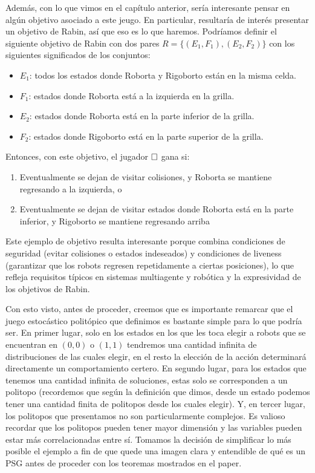 Además, con lo que vimos en el capítulo anterior, sería interesante pensar en
algún objetivo asociado a este jeugo. En particular, resultaría de interés
presentar un objetivo de Rabin, así que eso es lo que haremos. Podríamos
definir el siguiente objetivo de Rabin con dos pares
$R=\{(E_1,F_1),(E_2,F_2)\}$ con los siguientes significados de los conjuntos:

\begin{itemize}
	\item $E_1$: todos los estados donde Roborta y Rigoborto están en la misma celda.
	\item $F_1$: estados donde Roborta está a la izquierda en la grilla.
	\item $E_2$: estados donde Roborta está en la parte inferior de la grilla.
	\item $F_2$: estados donde Rigoborto está en la parte superior de la grilla.
\end{itemize}

Entonces, con este objetivo, el jugador $\square$ gana si:
\begin{enumerate}
	\item Eventualmente se dejan de visitar colisiones, y Roborta se mantiene regresando
	      a la izquierda, o
	\item Eventualmente se dejan de visitar estados donde Roborta está en la parte
	      inferior, y Rigoborto se mantiene regresando arriba
\end{enumerate}

Este ejemplo de objetivo resulta interesante porque combina condiciones de
seguridad (evitar colisiones o estados indeseados) y condiciones de liveness
(garantizar que los robots regresen repetidamente a ciertas posiciones), lo que
refleja requisitos típicos en sistemas multiagente y robótica y la expresividad
de los objetivos de Rabin.

Con esto visto, antes de proceder, creemos que es importante remarcar que el
juego estocástico politópico que definimos es bastante simple para lo que
podría ser. En primer lugar, solo en los estados en los que les toca elegir a
robots que se encuentran en $(0,0)$ o $(1,1)$ tendremos una cantidad infinita
de distribuciones de las cuales elegir, en el resto la elección de la acción
determinará directamente un comportamiento certero. En segundo lugar, para los
estados que tenemos una cantidad infinita de soluciones, estas solo se
corresponden a un politopo (recordemos que según la definición que dimos, desde
un estado podemos tener una cantidad finita de politopos desde los cuales
elegir). Y, en tercer lugar, los politopos que presentamos no son
particularmente complejos. Es valioso recordar que los politopos pueden tener
mayor dimensión y las variables pueden estar más correlacionadas entre sí.
Tomamos la decisión de simplificar lo más posible el ejemplo a fin de que quede
una imagen clara y entendible de qué es un PSG antes de proceder con los
teoremas mostrados en el paper.

